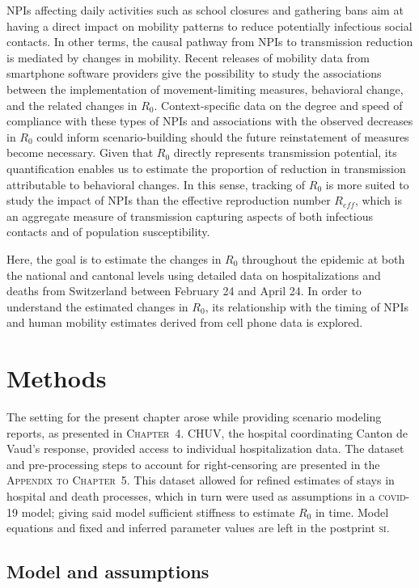 NPIs affecting daily activities such as school closures and gathering bans aim at having a direct impact on mobility patterns to reduce potentially infectious social contacts. In other terms, the causal pathway from NPIs to transmission reduction is mediated by changes in mobility. Recent releases of mobility data from smartphone software providers give the possibility to study the associations between the implementation of movement-limiting measures, behavioral change, and the related changes in $R_0$. Context-specific data on the degree and speed of compliance with these types of NPIs and associations with the observed decreases in $R_0$ could inform scenario-building should the future reinstatement of measures become necessary. Given that $R_0$ directly represents transmission potential, its quantification enables us to estimate the proportion of reduction in transmission attributable to behavioral changes. In this sense, tracking of $R_0$ is more suited to study the impact of NPIs than the effective reproduction number $R_{eff}$, which is an aggregate measure of transmission capturing aspects of both infectious contacts and of population susceptibility. 

Here, the goal is to estimate the changes in $R_0$ throughout the epidemic at both the national and cantonal levels using detailed data on hospitalizations and deaths from Switzerland between February 24 and April 24. In order to understand the estimated changes in $R_0$, its relationship with the timing of NPIs and human mobility estimates derived from cell phone data is explored.

\section{Methods}
The setting for the present chapter arose while providing scenario modeling reports, as presented in \textsc{Chapter~4}. CHUV, the hospital coordinating Canton de Vaud's response, provided access to individual hospitalization data. The dataset and pre-processing steps to account for right-censoring are presented in the \textsc{Appendix to Chapter~5}. This dataset allowed for refined estimates of stays in hospital and death processes, which in turn were used as assumptions in a \textsc{covid}-19 model; giving said model sufficient stiffness to estimate $R_0$ in time. Model equations and fixed and inferred parameter values are left in the postprint \textsc{si}.

\subsection{Model and assumptions}
